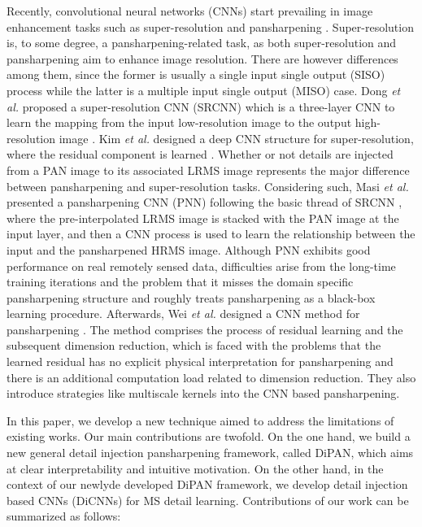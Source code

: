 \documentclass[journal]{IEEEtran}
\begin{document}
Recently, convolutional neural networks (CNNs) start prevailing in image enhancement tasks such as super-resolution \cite{SuperRes-CNN:Dong2016,Dong2014Learning} and pansharpening \cite{CNN-Pansharp:Masi2016,Wei2017Boosting}. Super-resolution is, to some degree, a pansharpening-related task, as both super-resolution and pansharpening aim to enhance image resolution. There are however differences among them, since the former is usually a single input single output (SISO) process while the latter is a multiple input single output (MISO) case. Dong \textit{et al.} proposed a super-resolution CNN (SRCNN) which is a three-layer CNN to learn the mapping from the input low-resolution image to the output high-resolution image \cite{SuperRes-CNN:Dong2016}. Kim \textit{et al.} designed a deep CNN structure for super-resolution, where the residual component is learned \cite{SuperRes-CNN:Kim2016}. Whether or not details are injected from a PAN image to its associated LRMS image represents the major difference between pansharpening and super-resolution tasks. Considering such, Masi \textit{et al.} presented a pansharpening CNN (PNN) following the basic thread of SRCNN \cite{CNN-Pansharp:Masi2016}, where the pre-interpolated LRMS image is stacked with the PAN image at the input layer, and then a CNN process is used to learn the relationship between the input and the pansharpened HRMS image. Although PNN exhibits good performance on real remotely sensed data, difficulties arise from the long-time training iterations and the problem that it misses the domain specific pansharpening structure and roughly treats pansharpening as a black-box learning procedure. Afterwards,
Wei \textit{et al.} designed a CNN method for pansharpening \cite{Wei2017Boosting}. The method comprises the process of residual learning and the subsequent dimension reduction, which is faced with the problems that the learned residual has no explicit physical interpretation for pansharpening and there is an additional computation load related to dimension reduction. They also introduce strategies like multiscale kernels into the CNN based pansharpening\cite{Yuan2018A}.

In this paper, we develop a new technique aimed to address the limitations of existing works. Our main contributions are twofold. On the one hand, we build a new general detail injection pansharpening framework, called DiPAN, which aims at clear interpretability and intuitive motivation. On the other hand, in the context of our newlyde developed DiPAN framework, we develop detail injection based CNNs (DiCNNs) for MS detail learning. Contributions of our work can be summarized as follows:
\end{document}
